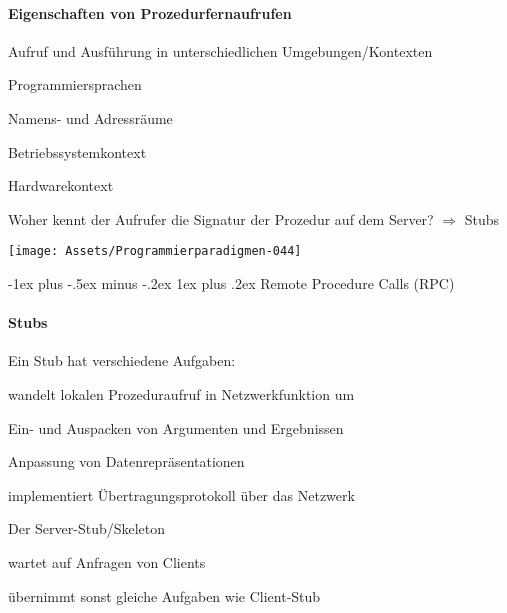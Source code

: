 \documentclass[10pt]{article}
\makeatletter
\renewcommand{\subsubsection}{\@startsection{subsubsection}{3}{0mm}%
                                {-1ex plus -.5ex minus -.2ex}%
                                {1ex plus .2ex}%
                                {\normalfont\small\bfseries}}
\makeatother
\begin{document}
\paragraph{Eigenschaften von Prozedurfernaufrufen}
Aufruf und Ausführung in unterschiedlichen Umgebungen/Kontexten
\begin{itemize*}
  \item Programmiersprachen
  \item Namens- und Adressräume
  \item Betriebssystemkontext
  \item Hardwarekontext
\end{itemize*}
Woher kennt der Aufrufer die Signatur der Prozedur auf dem Server? $\Rightarrow$ \color{orange} Stubs \color{black}
\begin{center}
  \centering
  \texttt{[image: Assets/Programmierparadigmen-044]}
\end{center}

\subsubsection{Remote Procedure Calls (RPC)}
\paragraph{Stubs}
Ein Stub hat verschiedene Aufgaben: 
\begin{itemize*}
  \item wandelt lokalen Prozeduraufruf in Netzwerkfunktion um
  \item Ein- und Auspacken von Argumenten und Ergebnissen
  \item Anpassung von Datenrepräsentationen
  \item implementiert Übertragungsprotokoll über das Netzwerk
\end{itemize*}
Der Server-Stub/Skeleton
\begin{itemize*}
  \item wartet auf Anfragen  von Clients
  \item übernimmt sonst gleiche Aufgaben wie Client-Stub
\end{itemize*}
\end{document}
